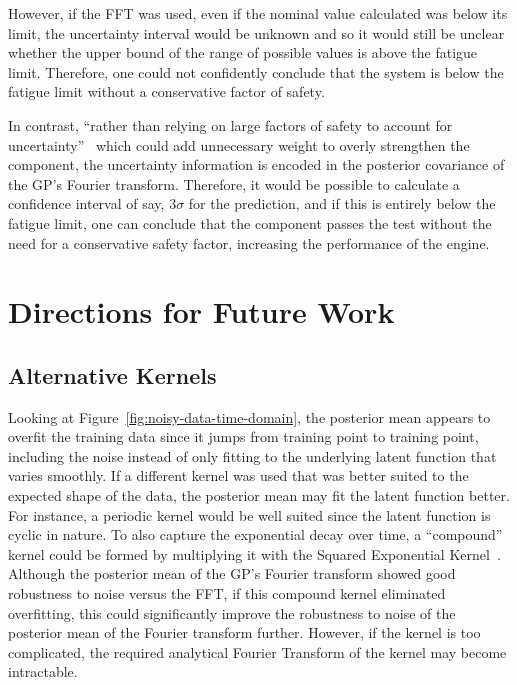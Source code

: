 \documentclass[12pt]{article}
\begin{document}
    However, if the FFT was used, even if the nominal value calculated was below its limit, the uncertainty interval would be unknown and so it would still be unclear whether the upper bound of the range of possible values is above the fatigue limit.
    Therefore, one could not confidently conclude that the system is below the fatigue limit without a conservative factor of safety.

    In contrast, ``rather than relying on large factors of safety to account for uncertainty''~\cite{Rogers2023} which could add unnecessary weight to overly strengthen the component, the uncertainty information is encoded in the posterior covariance of the GP's Fourier transform.
    Therefore, it would be possible to calculate a confidence interval of say, $3 \sigma$ for the prediction, and if this is entirely below the fatigue limit, one can conclude that the component passes the test without the need for a conservative safety factor, increasing the performance of the engine.

    \section{Directions for Future Work}
    \subsection{Alternative Kernels}
    Looking at Figure~\ref{fig:noisy-data-time-domain}, the posterior mean appears to overfit the training data since it jumps from training point to training point, including the noise instead of only fitting to the underlying latent function that varies smoothly.
    If a different kernel was used that was better suited to the expected shape of the data, the posterior mean may fit the latent function better.
    For instance, a periodic kernel would be well suited since the latent function is cyclic in nature.
    To also capture the exponential decay over time, a ``compound'' kernel could be formed by multiplying it with the Squared Exponential Kernel~\cite{duvenaud2014kernel}.
    Although the posterior mean of the GP's Fourier transform showed good robustness to noise versus the FFT, if this compound kernel eliminated overfitting, this could significantly improve the robustness to noise of the posterior mean of the Fourier transform further.
    However, if the kernel is too complicated, the required analytical Fourier Transform of the kernel may become intractable.
\end{document}
